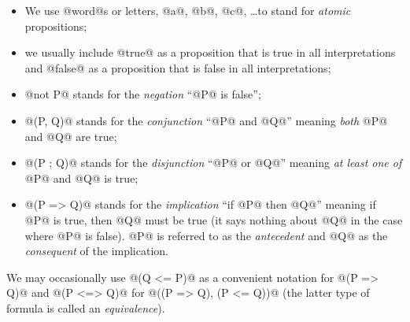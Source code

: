 \begin{itemize}
\item We use @word@s or letters, @a@, @b@, @c@, \ldots to stand for
\emph{atomic} propositions;
\item we usually include @true@ as a proposition that is true in all
interpretations and @false@ as a proposition that is false in all
interpretations;
\item @not P@ stands for the \emph{negation} ``@P@ is false'';
\item @(P, Q)@ stands for the \emph{conjunction} ``@P@ and @Q@'' meaning
\emph{both} @P@ and @Q@ are true;
\item @(P ; Q)@ stands for the \emph{disjunction} ``@P@ or @Q@'' meaning
\emph{at least one of} @P@ and @Q@ is true;
\item @(P => Q)@ stands for the \emph{implication} ``if @P@ then @Q@''
meaning if @P@ is true, then @Q@ must be true (it says nothing about @Q@
in the case where @P@ is false).  @P@ is referred to as the
\emph{antecedent} and @Q@ as the \emph{consequent} of the implication.
\end{itemize}

We may occasionally use @(Q <= P)@ as a convenient notation for
@(P => Q)@ and @(P <=> Q)@ for @((P => Q), (P <= Q))@ (the latter type
of formula is called an \emph{equivalence}).

